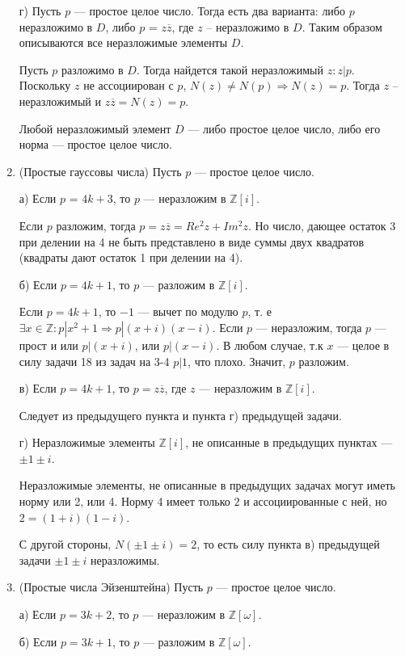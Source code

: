 \documentclass[../main.tex]{subfiles}
\begin{document}
\begin{enumerate}
г) Пусть $p$ — простое целое число. Тогда есть два варианта: либо $p$ неразложимо в $D$, либо $p$ = $z\overline{z}$, где $z$ -- неразложимо в $D$. Таким образом описываются все неразложимые элементы $D$.


Пусть $p$ разложимо в $D$. Тогда найдется такой неразложимый $z: z|p$. Поскольку $z$ не ассоциирован с $p$, $N(z) \ne N(p) \Rightarrow N(z) = p$. Тогда $z$ -- неразложимый и $z\overline{z} = N(z) = p$.

Любой неразложимый элемент $D$ --- либо простое целое число, либо его норма --- простое целое число.

\item (Простые гауссовы числа) Пусть $p$ --- простое целое число.

а) Если $p$ = $4k + 3$, то $p$ --- неразложим в $\mathbb{Z}[i]$.

Если $p$ разложим, тогда $p = z\overline{z} = Re^2z + Im^2z$. Но число, дающее остаток 3 при делении на 4 не быть представлено в виде суммы двух квадратов (квадраты дают остаток 1 при делении на 4).

б) Если $p = 4k + 1$, то $p$ — разложим в $\mathbb{Z}[i]$.

Если $p = 4k + 1$, то $-1$ --- вычет по модулю $p$, т. е $\exists x \in \mathbb{Z}: p| x^2 + 1 \Rightarrow p | (x + i)(x - i)$. Если $p$ --- неразложим, тогда $p$ --- прост и или $p| (x + i)$, или $p | (x - i)$. В любом случае, т.к $x$ --- целое в силу задачи 18 из задач на 3-4 $p | 1$, что плохо. Значит, $p$ разложим.

в) Если $p = 4k + 1$, то $p = z\overline{z}$, где $z$ — неразложим в $\mathbb{Z}[i]$.

Следует из предыдущего пункта и пункта г) предыдущей задачи.

г) Неразложимые элементы $\mathbb{Z}[i]$, не описанные в предыдущих пунктах --- $\pm 1 \pm i$.

Неразложимые элементы, не описанные в предыдущих задачах могут иметь норму или 2, или 4. Норму 4 имеет только $2$ и ассоциированные с ней, но $2 = (1 + i)(1 - i)$.

С другой стороны, $N(\pm 1 \pm i) = 2$, то есть силу пункта в) предыдущей задачи $\pm 1 \pm i$ неразложимы.


\item (Простые числа Эйзенштейна) Пусть $p$ --- простое целое число.

а) Если $p = 3k + 2$, то $p$ --- неразложим в $\mathbb{Z}[\omega]$.

б) Если $p = 3k + 1$, то $p$ --- разложим в $\mathbb{Z}[\omega]$.


\end{enumerate}
\end{document}

